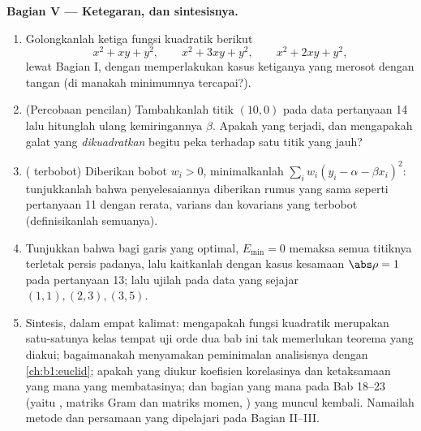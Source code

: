 \begin{problem}
\medskip
\noindent\textbf{Bagian V --- Ketegaran, dan sintesisnya.}
\begin{enumerate}[resume]
  \item Golongkanlah  ketiga fungsi kuadratik
        berikut
        \[
        x^2 + xy + y^2, \qquad x^2 + 3xy + y^2, \qquad
        x^2 + 2xy + y^2 ,
        \]
        lewat Bagian I, dengan memperlakukan kasus ketiganya yang merosot dengan tangan
        (di manakah minimumnya tercapai?).
  \item (Percobaan pencilan) Tambahkanlah titik $(10, 0)$ pada
        data pertanyaan 14 lalu hitunglah ulang kemiringannya $\beta$.
        Apakah yang terjadi, dan mengapakah galat yang \emph{dikuadratkan} begitu
        peka terhadap satu titik yang jauh?
  \item ( terbobot) Diberikan bobot $w_i > 0$,
        minimalkanlah $\sum_i w_i(y_i - \alpha - \beta x_i)^2$: tunjukkanlah
        bahwa penyelesaiannya diberikan rumus yang sama seperti pertanyaan
        11 dengan rerata, varians dan kovarians yang terbobot
        (definisikanlah semuanya).
  \item Tunjukkan bahwa bagi garis yang optimal, $E_{\min} = 0$ memaksa
        semua titiknya terletak persis padanya, lalu kaitkanlah dengan
        kasus kesamaan $\abs\rho = 1$ pada pertanyaan 13; lalu ujilah pada
        data yang sejajar $(1,1), (2,3), (3,5)$.
  \item Sintesis, dalam empat kalimat: mengapakah fungsi kuadratik
        merupakan satu-satunya kelas tempat uji orde dua bab ini
        tak memerlukan teorema yang diakui; bagaimanakah 
        menyamakan peminimalan analisisnya dengan  \cref{ch:b1:euclid}; apakah yang diukur koefisien
        korelasinya dan ketaksamaan yang mana yang membatasinya;
        dan bagian yang mana pada Bab 18--23 (yaitu , matriks Gram dan
        matriks momen, ) yang muncul kembali. Namailah
        metode dan persamaan yang dipelajari pada Bagian II--III.

\end{enumerate}
\end{problem}
